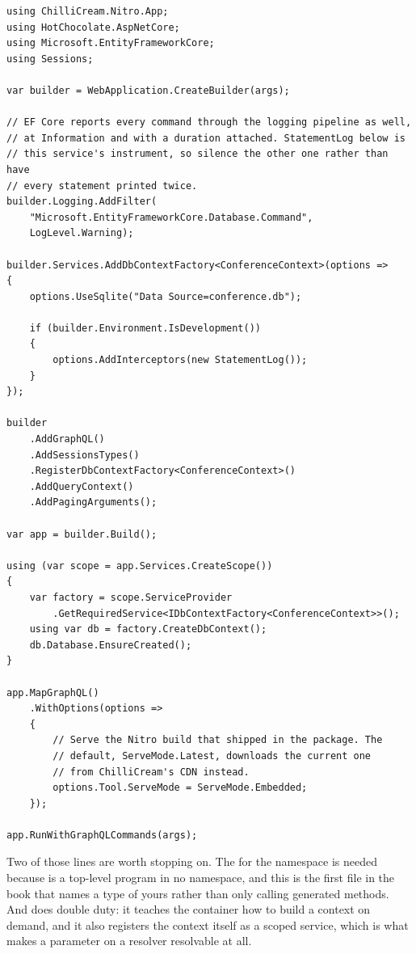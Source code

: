 \begin{verbatim}
using ChilliCream.Nitro.App;
using HotChocolate.AspNetCore;
using Microsoft.EntityFrameworkCore;
using Sessions;

var builder = WebApplication.CreateBuilder(args);

// EF Core reports every command through the logging pipeline as well,
// at Information and with a duration attached. StatementLog below is
// this service's instrument, so silence the other one rather than have
// every statement printed twice.
builder.Logging.AddFilter(
    "Microsoft.EntityFrameworkCore.Database.Command",
    LogLevel.Warning);

builder.Services.AddDbContextFactory<ConferenceContext>(options =>
{
    options.UseSqlite("Data Source=conference.db");

    if (builder.Environment.IsDevelopment())
    {
        options.AddInterceptors(new StatementLog());
    }
});

builder
    .AddGraphQL()
    .AddSessionsTypes()
    .RegisterDbContextFactory<ConferenceContext>()
    .AddQueryContext()
    .AddPagingArguments();

var app = builder.Build();

using (var scope = app.Services.CreateScope())
{
    var factory = scope.ServiceProvider
        .GetRequiredService<IDbContextFactory<ConferenceContext>>();
    using var db = factory.CreateDbContext();
    db.Database.EnsureCreated();
}

app.MapGraphQL()
    .WithOptions(options =>
    {
        // Serve the Nitro build that shipped in the package. The
        // default, ServeMode.Latest, downloads the current one
        // from ChilliCream's CDN instead.
        options.Tool.ServeMode = ServeMode.Embedded;
    });

app.RunWithGraphQLCommands(args);
\end{verbatim}

%
Two of those lines are worth stopping on. The  for the
 namespace is needed because  is a top-level
program in no namespace, and this is the first file in the book that names a
type of yours rather than only calling generated methods. And
 does double duty: it teaches the container how to
build a context on demand, and it also registers the context itself as a
scoped service, which is what makes a  parameter on a
resolver resolvable at all.

